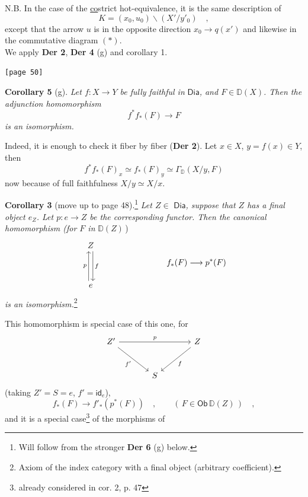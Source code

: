\documentclass[11pt]{article}
\newcommand{\printedpage}[1]{\marginpar{\footnotesize p.~#1}}
\newcommand{\msp}[1]{\marginpar{\footnotesize [#1]}}
\newcommand{\D}{\mathbb{D}}
\newcommand{\Dia}{\mathsf{Dia}}
\newcommand{\Ob}{\mathsf{Ob}}
\begin{document}
\printedpage{28}

\noindent N.B. In the case of the \underline{co}strict hot-equivalence, it is the same description of
\[ K = (x_{0}, u_{0})\backslash(X'/y'_{0}) \quad , \]
except that the arrow $u$ is in the opposite direction $x_{0} \to q(x')$ and likewise in the commutative diagram $(*)$.\\
We apply \textbf{Der 2}, \textbf{Der 4} (g) and corollary 1.

\noindent\msp{page 50}\texttt{[page 50]}

\noindent\textbf{Corollary 5} (g). \textit{Let $f : X \to Y$ be fully faithful in} $\Dia$\textit{, and $F \in \D(X)$. Then the adjunction homomorphism}
\[ f^{*} f_{*}(F) \longrightarrow F \]
\textit{is an isomorphism.}

Indeed, it is enough to check it fiber by fiber (\textbf{Der 2}). Let $x \in X$, $y = f(x) \in Y$, %
then
\[ f^{*} f_{*}(F)_{x} \simeq f_{*}(F)_{y} \simeq \Gamma_{\D}(X/y, F) \]
now because of full faithfulness $X/y \simeq X/x$.

\noindent\textbf{Corollary 3} (move up to page 48).\footnote[20]{Will follow from the stronger \textbf{Der 6} (g) below.} \textit{Let $Z \in$} $\Dia$\textit{, suppose that $Z$ has a final object $e_{Z}$. Let $p : e \to Z$ be the corresponding functor. Then the canonical homomorphism (for $F$ in} $\D(Z)$\,)
\[
\begin{tikzcd}[row sep=huge]
Z \arrow[d, shift left=0.6ex, "f"] \\
e \arrow[u, shift left=0.6ex, "p"]
\end{tikzcd}
\qquad\qquad\qquad\qquad
f_{*}(F) \longrightarrow p^{*}(F)
\]
\textit{is an isomorphism.}\footnote[21]{Axiom of the index category with a final object (arbitrary coefficient).}

This homomorphism is special case of this one, for
\[
\begin{tikzcd}[row sep=large, column sep=large]
Z' \arrow[rr, "p"] \arrow[dr, "f'"'] & & Z \arrow[dl, "f"] \\
& S &
\end{tikzcd}
\]
(taking $Z' = S = e$, $f' = \mathsf{id}_{e}$),
\[ f_{*}(F) \longrightarrow f'_{*}(p^{*}(F)) \quad , \qquad (\, F \in \Ob\,\D(Z)\,) \quad , \]
and it is a special case\footnote[22]{already considered in cor. 2, p. 47} of the morphisms of
\end{document}
